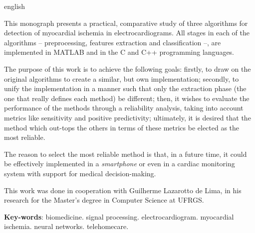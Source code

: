 
\begin{resumo}[Abstract]
\begin{otherlanguage*}{english}

\setlength{\parindent}{0.6cm}

This monograph presents a practical, comparative study of three algorithms for detection of myocardial ischemia in electrocardiograms. All stages in each of the algorithms -- preprocessing, features extraction and classification --, are implemented in MATLAB and in the C and C++ programming languages.

The purpose of this work is to achieve the following goals: firstly, to draw on the original algorithms to create a similar, but own implementation; secondly, to unify the implementation in a manner such that only the extraction phase (the one that really defines each method) be different; then, it wishes to evaluate the performance of the methods through a reliability analysis, taking into account metrics like sensitivity and positive predictivity; ultimately, it is desired that the method which out-tops the others in terms of these metrics be elected as the most reliable.

The reason to select the most reliable method is that, in a future time, it could be effectively implemented in a \emph{smartphone} or even in a cardiac monitoring system with support for medical decision-making.

This work was done in cooperation with Guilherme Lazarotto de Lima, in his research for the Master's degree in Computer Science at UFRGS.


\null\vfill
\textbf{Key-words}: biomedicine. signal processing. electrocardiogram. myocardial ischemia. neural networks. telehomecare.

\end{otherlanguage*}
\end{resumo}